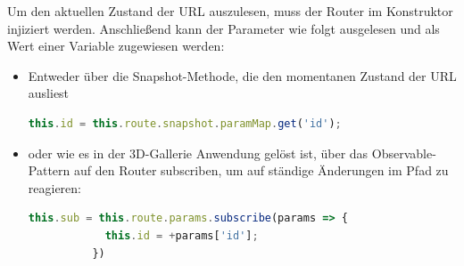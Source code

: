 Um den aktuellen Zustand der URL auszulesen, muss der Router im Konstruktor injiziert werden. Anschließend kann der Parameter wie folgt ausgelesen und als Wert einer Variable zugewiesen werden:

\begin{itemize}
    \item Entweder über die Snapshot-Methode, die den momentanen Zustand der URL ausliest 
    \begin{lstlisting}[caption={Snapshot der URL abfragen},language=TypeScript,label=lst:impl:routingsnapshot]
        this.id = this.route.snapshot.paramMap.get('id');
    \end{lstlisting}
    \item oder wie es in der 3D-Gallerie Anwendung gelöst ist, über das Observable-Pattern auf den Router subscriben, um auf ständige Änderungen im Pfad zu reagieren:
    \begin{lstlisting}[caption={Die URL subscriben},language=TypeScript,label=lst:impl:urlsubscription]
        this.sub = this.route.params.subscribe(params => {
            this.id = +params['id'];
          })
    \end{lstlisting}
\end{itemize}
\cite{AngularBuch}
